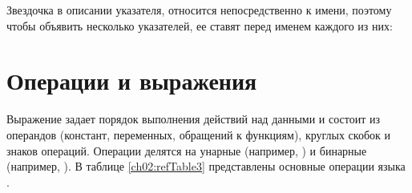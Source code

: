 



Звездочка в описании указателя, относится непосредственно к имени, поэтому чтобы объявить несколько
указателей, ее ставят перед именем каждого из них: 




\section[Операции и выражения]{Операции и выражения}\label{ch02:6}
Выражение задает порядок выполнения действий над данными и состоит из
операндов (констант, переменных, обращений к функциям), круглых скобок и знаков
операций. Операции делятся на унарные
(например, ) и бинарные
(например,  ). В таблице \ref{ch02:refTable3} представлены основные операции языка .


